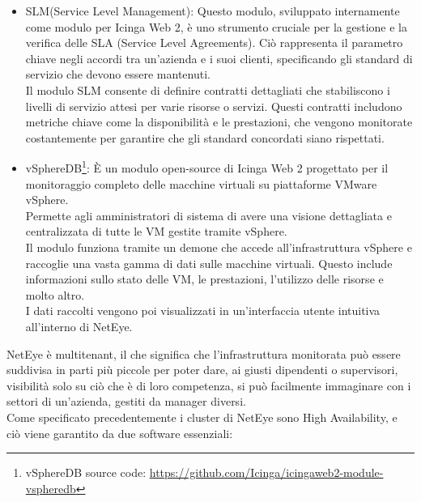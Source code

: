 \begin{itemize}
  \item SLM(Service Level Management): Questo modulo, sviluppato internamente
    come modulo per Icinga Web 2, è uno strumento cruciale per la gestione e la verifica
    delle SLA (Service Level Agreements). Ciò rappresenta il parametro chiave
    negli accordi tra un'azienda e i suoi clienti, specificando gli standard di servizio
    che devono essere mantenuti.\\ Il modulo SLM consente di definire contratti dettagliati
    che stabiliscono i livelli di servizio attesi per varie risorse o servizi.
    Questi contratti includono metriche chiave come la disponibilità e le
    prestazioni, che vengono monitorate costantemente per garantire che gli standard
    concordati siano rispettati.

  \item vSphereDB\footnote{vSphereDB source code: \url{https://github.com/Icinga/icingaweb2-module-vspheredb}}:
    È un modulo open-source di Icinga Web 2 progettato per il monitoraggio completo
    delle macchine virtuali su piattaforme VMware vSphere.\\ Permette agli amministratori
    di sistema di avere una visione dettagliata e centralizzata di tutte le VM gestite
    tramite vSphere.\\ Il modulo funziona tramite un demone che accede all'infrastruttura
    vSphere e raccoglie una vasta gamma di dati sulle macchine virtuali. Questo
    include informazioni sullo stato delle VM, le prestazioni, l'utilizzo delle
    risorse e molto altro.\\ I dati raccolti vengono poi visualizzati in un'interfaccia
    utente intuitiva all'interno di NetEye.
\end{itemize}
NetEye è multitenant, il che significa che l'infrastruttura monitorata può essere
suddivisa in parti più piccole per poter dare, ai giusti dipendenti o
supervisori, visibilità solo su ciò che è di loro competenza, si può facilmente
immaginare con i settori di un'azienda, gestiti da manager diversi.\\ Come specificato
precedentemente i cluster di NetEye sono High Availability, e ciò viene
garantito da due software essenziali:
